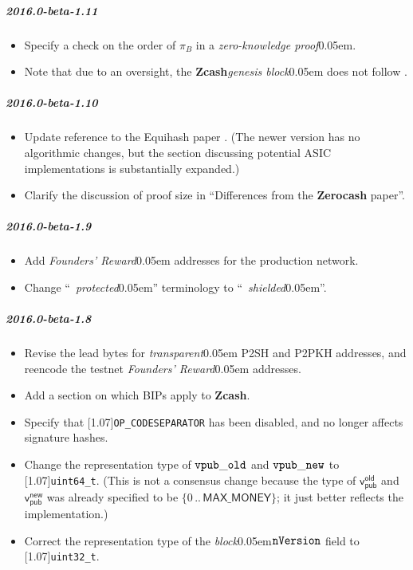 \documentclass{article}
\let\oldtexttt\texttt
\let\oldmathtt\mathtt
\renewcommand{\texttt}[1]{\scalebox{1.02}[1.07]{\oldtexttt{#1}}}
\renewcommand{\mathtt}[1]{\scalebox{1.02}[1.07]{$\oldmathtt{#1}$}}
\newcommand{\introlist}{\needspace{15ex}}
\numberwithin{theorem}{subsection}
\newcommand{\term}[1]{\textsl{#1}\kern 0.05em\xspace}
\newcommand{\termbf}[1]{\textbf{#1}\xspace}
\newcommand{\quotedterm}[1]{``~\!\!\term{#1}''}
\newcommand{\Zcash}{\termbf{Zcash}}
\newcommand{\Zerocash}{\termbf{Zerocash}}
\newcommand{\zeroKnowledgeProof}{\term{zero-knowledge proof}}
\newcommand{\block}{\term{block}}
\newcommand{\genesisBlock}{\term{genesis block}}
\newcommand{\transparent}{\term{transparent}}
\newcommand{\setof}[1]{\{{#1}\}}
\newcommand{\barerange}[2]{{#1}\,..\,{#2}}
\newcommand{\range}[2]{\setof{\barerange{#1}{#2}}}
\newcommand{\MAXMONEY}{\mathsf{MAX\_MONEY}}
\newcommand{\foundersReward}{\term{Founders' Reward}}
\newcommand{\vpubOldField}{\mathtt{vpub\_old}}
\newcommand{\vpubNewField}{\mathtt{vpub\_new}}
\newcommand{\type}[1]{\texttt{#1}}
\newcommand{\ScriptOP}[1]{\texttt{OP\_{#1}}}
\newcommand{\nVersion}{\mathtt{nVersion}}
\newcommand{\Proof}[1]{\pi_{\!{#1}}}
\newcommand{\vpubOld}{\mathsf{v_{pub}^{old}}}
\newcommand{\vpubNew}{\mathsf{v_{pub}^{new}}}
\begin{document}
\introlist
\subparagraph{2016.0-beta-1.11}

\begin{itemize}
    \item Specify a check on the order of $\Proof{B}$ in a \zeroKnowledgeProof.
    \item Note that due to an oversight, the \Zcash \genesisBlock does not
          follow \cite{BIP-34}.
\end{itemize}

\introlist
\subparagraph{2016.0-beta-1.10}

\begin{itemize}
    \item Update reference to the Equihash paper \cite{BK2016}. (The newer version
          has no algorithmic changes, but the section discussing potential ASIC
          implementations is substantially expanded.)
    \item Clarify the discussion of proof size in ``Differences from the \Zerocash paper''.
\end{itemize}

\introlist
\subparagraph{2016.0-beta-1.9}

\begin{itemize}
    \item Add \foundersReward addresses for the production network.
    \item Change \quotedterm{protected} terminology to \quotedterm{shielded}.
\end{itemize}

\introlist
\subparagraph{2016.0-beta-1.8}

\begin{itemize}
    \item Revise the lead bytes for \transparent P2SH and P2PKH addresses,
          and reencode the testnet \foundersReward addresses.
    \item Add a section on which BIPs apply to \Zcash.
    \item Specify that \ScriptOP{CODESEPARATOR} has been disabled, and
          no longer affects signature hashes.
    \item Change the representation type of $\vpubOldField$ and $\vpubNewField$
          to \type{uint64\_t}. (This is not a consensus change because the type of
          $\vpubOld$ and $\vpubNew$ was already specified to be $\range{0}{\MAXMONEY}$;
          it just better reflects the implementation.)
    \item Correct the representation type of the \block $\nVersion$ field to
          \type{uint32\_t}.
\end{itemize}
\end{document}

